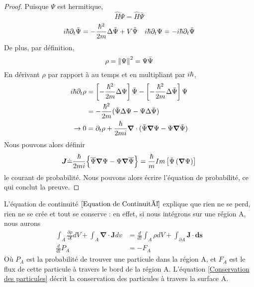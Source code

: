 \documentclass[../notesdecours]{subfiles}
\begin{document}
\begin{proof}
Puisque $\Psi$ est hermitique,
\begin{equation}
\hat{H}\Psi = \hat{H}\bar{\Psi}
\end{equation}
\begin{align}
i\hbar\partial_t\bar{\Psi} &= - \frac{\hbar^2}{2m}\Delta\bar{\Psi}+V\bar{\Psi}	&i\hbar\partial_t\Psi = -i\hbar\partial_t\bar{\Psi}
\end{align}
De plus, par définition,
\begin{equation}
\rho = \norm{\Psi}^2 = \Psi\bar{\Psi}
\end{equation}
En dérivant $\rho$ par rapport à au temps et en multipliant par $i\hbar$,
\begin{align}
i\hbar\partial_t\rho &= \left[-\frac{\hbar^2}{2m}\Delta \Psi\right]\bar{\Psi} - \left[-\frac{\hbar^2}{2m}\Delta\bar{\Psi}\right]\Psi\\
&= -\frac{\hbar^2}{2m} (\bar{\Psi}\Delta\Psi - \Psi\Delta\bar{\Psi})\\
\rightarrow 0 &= \partial_t\rho + \frac{\hbar}{2mi}\bm{\nabla}\cdot(\bar{\Psi}\bm{\nabla}\Psi - \Psi\bm{\nabla}\bar{\Psi})
\end{align}
Nous pouvons alors définir 
\begin{equation}
\bm{J} \dot{=} \frac{\hbar}{2mi} \Big\{\overline{\Psi}\bm{\nabla}\Psi - \Psi\bm{\nabla}\overline{\Psi}\Big\} = \frac{\hbar}{m} Im \left[\bar{\Psi} \left(\bm{\nabla} \Psi\right)\right]
\label{Courant de probabilité}
\end{equation}
le courant de probabilité. Nous pouvons alors écrire l'équation de probabilité, ce qui conclut la preuve.
\end{proof}

L'équation de continuité $\eqref{Equation de Continuité}$ explique que rien ne se perd, rien ne se crée et tout se conserve : en effet, si nous intégrons sur une région A, nous aurons
\begin{align}
\int_A \frac{\partial \rho}{\partial t} dV + \int_A \bm{\nabla}\cdot\bm{J} dv &= \frac{d}{dt} \int_A \rho dV + \int_{\partial A} \bm{J}\cdot\bm{ds}\\
\frac{d}{dt} P_A &= -F_A \label{Conservation des particules}
\end{align}
Où $P_A$ est la probabilité de trouver une particule dans la région A, et $F_A$ est le flux de cette particule à travers le bord de la région A. L'équation \eqref{Conservation des particules} décrit la conservation des particules à travers la surface A.\\
\end{document}
